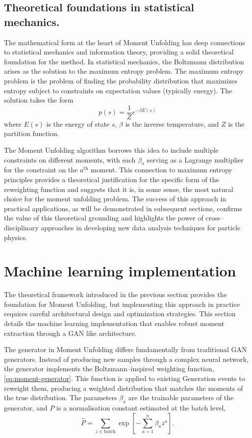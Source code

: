     \subsection{Theoretical foundations in statistical mechanics.}
        The mathematical form at the heart of Moment Unfolding has deep connections to statistical mechanics and information theory, providing a solid theoretical foundation for the method.
        In statistical mechanics, the Boltzmann distribution arises as the solution to the maximum entropy problem.
        The maximum entropy problem is the problem of finding the probability distribution that maximizes entropy subject to constraints on expectation values (typically energy).
        The solution takes the form
        \[
            p(s) = \frac{1}{Z} e^{-\beta E(s)}
        \]
        where $E(s)$ is the energy of state $s$, $\beta$ is the inverse temperature, and $Z$ is the partition function.

        The Moment Unfolding algorithm borrows this idea to include multiple constraints on different moments, with each $\beta_a$ serving as a Lagrange multiplier for the constraint on the $a^{\text{th}}$ moment.
        This connection to maximum entropy principles provides a theoretical justification for the specific form of the reweighting function and suggests that it is, in some sense, the most natural choice for the moment unfolding problem.
        The success of this approach in practical applications, as will be demonstrated in subsequent sections, confirms the value of this theoretical grounding and highlights the power of cross--disciplinary approaches in developing new data analysis techniques for particle physics.
\section{Machine learning implementation}
    The theoretical framework introduced in the previous section provides the foundation for Moment Unfolding, but implementing this approach in practice requires careful architectural design and optimization strategies.
    This section details the machine learning implementation that enables robust moment extraction through a GAN like architecture.

    The generator in Moment Unfolding differs fundamentally from traditional GAN generators.
    Instead of producing new samples through a complex neural network, the generator implements the Boltzmann--inspired weighting function, \cref{eq:moment-generator}.
    This function is applied to existing Generation events to reweight them, producing a weighted distribution that matches the moments of the true distribution.
    The parameters $\beta_a$ are the trainable parameters of the generator, and $P$ is a normalisation constant estimated at the batch level,
    \[
        \hat P = \sum_{z \in \text{batch}} \exp\left[-\sum_{a=1}^n\beta_a z^a\right].
    \]

